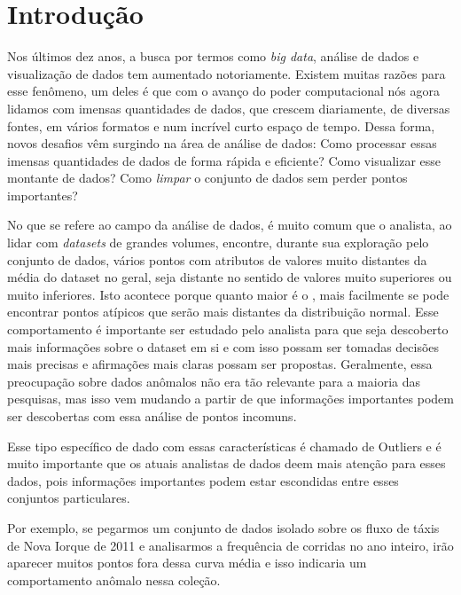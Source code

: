 \chapter{Introdução}



Nos últimos dez anos, a busca por termos como \textit{big data}, análise de dados e visualização de dados tem aumentado notoriamente. Existem muitas razões para esse fenômeno, um deles é que com o avanço do poder computacional nós agora lidamos com imensas quantidades de dados, que crescem diariamente, de diversas fontes, em vários formatos e num incrível curto espaço de tempo. Dessa forma, novos desafios vêm surgindo na área de análise de dados: Como processar essas imensas quantidades de dados de forma rápida e eficiente? Como visualizar esse montante de dados? Como \textit{limpar} o conjunto de dados sem perder pontos importantes?

No que se refere ao campo da análise de dados, é muito comum que o analista, ao lidar com \textit{datasets} de grandes volumes, encontre, durante sua exploração pelo conjunto de dados, vários pontos com atributos de valores muito distantes da média do dataset no geral, seja distante no sentido de valores muito superiores ou muito inferiores. Isto acontece porque quanto maior é o , mais facilmente se pode encontrar pontos atípicos que serão mais distantes da distribuição normal. Esse comportamento é importante ser estudado pelo analista para que seja descoberto mais informações sobre o dataset em si e com isso possam ser tomadas decisões mais precisas e afirmações mais claras possam ser propostas. Geralmente, essa preocupação sobre dados anômalos não era tão relevante para a maioria das pesquisas, mas isso vem mudando a partir de que informações importantes podem ser descobertas com essa análise de pontos incomuns.

Esse tipo específico de dado com essas características é chamado de Outliers e é muito importante que os atuais analistas de dados deem mais atenção para esses dados, pois informações importantes podem estar escondidas entre esses conjuntos particulares.

Por exemplo, se pegarmos um conjunto de dados isolado sobre os fluxo de táxis de Nova Iorque de 2011 e analisarmos a frequência de corridas no ano inteiro, irão aparecer muitos pontos fora dessa curva média e isso indicaria um comportamento anômalo nessa coleção.

